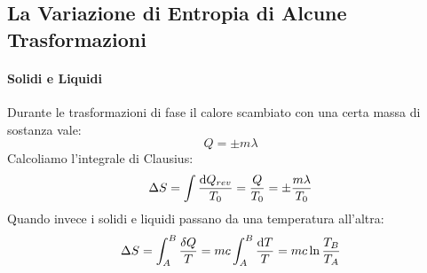\documentclass{article}
\begin{document}
\subsection{La Variazione di Entropia di Alcune Trasformazioni}
\paragraph{Solidi e Liquidi}
Durante le trasformazioni di fase il calore scambiato con una certa massa di sostanza vale:
\[Q=\pm m\lambda\]
Calcoliamo l'integrale di Clausius:
\begin{equation}
    \Delta S=\int \frac{\dif Q_{rev}}{T_0}=\frac{Q}{T_0}=\pm\frac{m\lambda}{T_0}
\end{equation}
Quando invece i solidi e liquidi passano da una temperatura all'altra:
\[\Delta S=\int_A^B\frac{\delta Q}{T}=mc\int_A^B\frac{\dif T}{T}=mc\ln\frac{T_B}{T_A}\]
\end{document}
